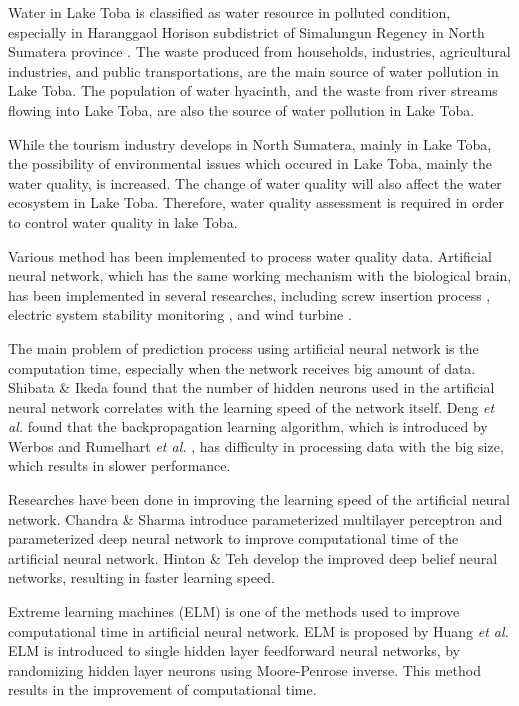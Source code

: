 \documentclass{ws-ijait}
\begin{document}
Water in Lake Toba is classified as water resource in polluted condition, especially in Haranggaol Horison subdistrict of Simalungun Regency in North Sumatera province\cite{1} . The waste produced from households, industries, agricultural industries, and public transportations, are the main source of water pollution in Lake Toba. The population of water hyacinth, and the waste from river streams flowing into Lake Toba, are also the source of water pollution in Lake Toba.

While the tourism industry develops in North Sumatera, mainly in Lake Toba, the possibility of environmental issues which occured in Lake Toba, mainly the water quality, is increased. The change of water quality will also affect the water ecosystem in Lake Toba. Therefore, water quality assessment is required in order to control water quality in lake Toba.

Various method has been implemented to process water quality data. Artificial neural network, which has the same working mechanism with the biological brain, has been implemented in several researches, including screw insertion process\cite{2} , electric system stability monitoring\cite{3} , and wind turbine\cite{4} .

The main problem of prediction process using artificial neural network is the computation time, especially when the network receives big amount of data. Shibata \& Ikeda\cite{5} found that the number of hidden neurons used in the artificial neural network correlates with the learning speed of the network itself. Deng \textit{et al.}\cite{6} found that the backpropagation learning algorithm, which is introduced by Werbos\cite{7} and Rumelhart \textit{et al.}\cite{8} , has difficulty in processing data with the big size, which results in slower performance.

Researches have been done in improving the learning speed of the artificial neural network. Chandra \& Sharma introduce parameterized multilayer perceptron\cite{9} and parameterized deep neural network \cite{10} to improve computational time of the artificial neural network. Hinton \& Teh\cite{11} develop the improved deep belief neural networks, resulting in faster learning speed.

Extreme learning machines (ELM) is one of the methods used to improve computational time in artificial neural network. ELM is proposed by Huang \textit{et al.}\cite{12} ELM is introduced to single hidden layer feedforward neural networks, by randomizing hidden layer neurons using Moore-Penrose inverse. This method results in the improvement of computational time.
\end{document}
